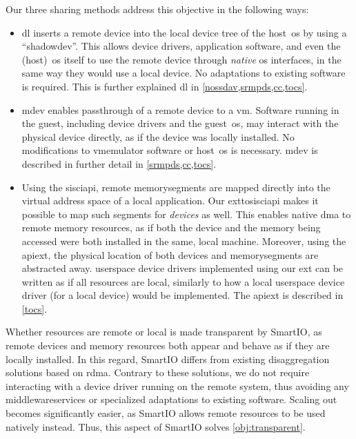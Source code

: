 \objtransparent*%
%
Our three sharing methods address this objective in the following ways:
%
\begin{itemize}
    \item \Gls{dl} inserts a remote device into the local device tree of the \gls{host}~\gls{os} by using a ``\gls{shadowdev}''.
        This allows device drivers, application software, and even the (\gls{host})~\gls{os} itself to use the remote device through \emph{native} \gls{os} interfaces, in the same way they would use a local device.
        No adaptations to existing software is required.
        This is further explained \gls{dl} in \cref{nossdav,srmpds,cc,tocs}.
    


    \item \Gls{mdev} enables \gls{passthrough} of a remote device to a \gls{vm}.
        Software running in the \gls{guest}, including device drivers and the \gls{guest}~\gls{os}, may interact with the physical device directly, as if the device was locally installed.
        No modifications to \gls{vmemulator} software or \gls{host}~\gls{os} is necessary.
        \Gls{mdev} is described in further detail in \cref{srmpds,cc,tocs}.


    \item Using the \gls{sisciapi}, remote \glspl{memorysegment} are mapped directly into the virtual address space of a local application.
        Our \gls{exttosisciapi} makes it possible to map such \glspl{segment} for \emph{devices} as well.
        This enables native \gls{dma} to remote memory resources, as if both the device and the memory being accessed were both installed in the same, local machine.
        Moreover, using the \gls{apiext}, the physical location of both devices and \glspl{memorysegment} are abstracted away.
        \Gls{userspace} device drivers implemented using our \gls{ext} can be written as if all resources are local, similarly to how a local \gls{userspace} device driver (for a local device) would be implemented.
        The \gls{apiext} is described in \cref{tocs}.
\end{itemize}
%
Whether resources are remote or local is made transparent by SmartIO, as remote devices and memory resources both appear and behave as if they are locally installed.
%
In this regard, SmartIO differs from existing \gls{disaggregation} solutions based on \gls{rdma}.
%
Contrary to these solutions, we do not require interacting with a device driver running on the remote system, thus avoiding any \glspl{middlewareservice} or specialized adaptations to existing software.
%
Scaling out becomes significantly easier, as SmartIO allows remote resources to be used natively instead.
%
Thus, this aspect of SmartIO solves \cref*{obj:transparent}.



